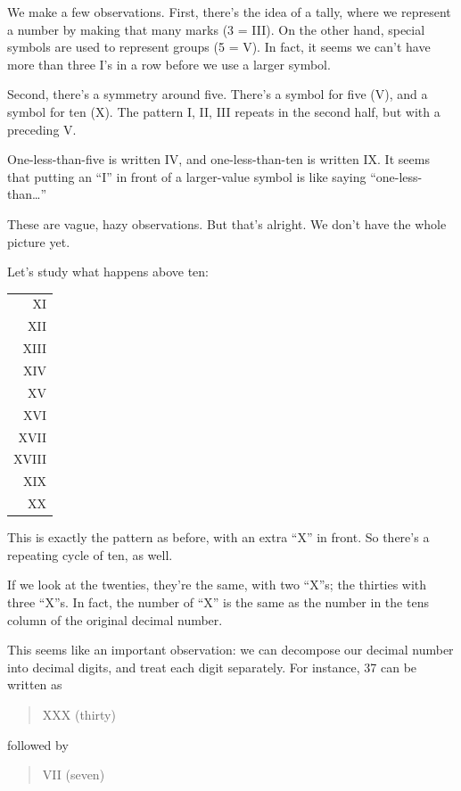 \noindent We make a few observations. First, there's the idea of a
tally, where we represent a number by making that many marks (3 =
III). On the other hand, special symbols are used to represent groups
(5 = V). In fact, it seems we can't have more than three I's in a row
before we use a larger symbol.

Second, there's a symmetry around five. There's a symbol for five
(V), and a symbol for ten (X). The pattern I, II, III repeats in the second
half, but with a preceding V.

One-less-than-five is written IV, and one-less-than-ten is written IX.
It seems that putting an ``I'' in front of a larger-value symbol is like
saying ``one-less-than\dots{}''

These are vague, hazy observations. But that's alright. We don't
have the whole picture yet.

Let's study what happens above ten:

\bigskip
{\sf\begin{tabular}{r}
XI \\
XII \\
XIII \\
XIV \\
XV \\
XVI \\
XVII \\
XVIII \\
XIX \\
XX \\
\end{tabular}}

\noindent This is exactly the pattern as before, with an extra ``X''
in front. So there's a repeating cycle of ten, as well.

If we look at the twenties, they're the same, with two ``X''s; the
thirties with three ``X''s. In fact, the number of ``X'' is the same as the
number in the tens column of the original decimal number.

This seems like an important observation: we can decompose our decimal
number into decimal digits, and treat each digit separately. For instance,
37 can be written as

\begin{quote}
{\sf XXX (thirty)}
\end{quote}

\noindent followed by

\begin{quote}
{\sf VII (seven)}
\end{quote}

